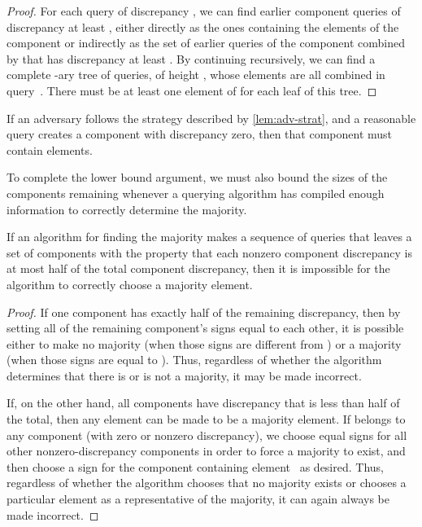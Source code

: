 \documentclass[11pt]{llncs}
\begin{document}
\begin{proof}
For each query  of discrepancy , we can find  earlier component queries of discrepancy at least , either directly as the ones containing the elements of the component or indirectly as the set of  earlier queries of the component combined by  that has discrepancy at least .
By continuing recursively, we can find a complete -ary tree of queries, of height , whose elements are all combined in query~. There must be at least one element of  for each leaf of this tree.
\end{proof}

\begin{corollary}
\label{cor:zero-components}
If an adversary follows the strategy described by \autoref{lem:adv-strat}, and a reasonable query creates a component with discrepancy zero, then that component must contain  elements.
\end{corollary}

To complete the lower bound argument, we must also bound the sizes of the components remaining whenever a querying algorithm has compiled enough information to correctly determine the majority.

\begin{lemma}
If an algorithm for finding the majority makes a sequence of queries that leaves a set of components with the property that each nonzero component discrepancy is at most half of the total component discrepancy, then it is impossible for the algorithm to correctly choose a majority element.
\end{lemma}

\begin{proof}
If one component  has exactly half of the remaining discrepancy, then by setting all of the remaining component's signs  equal to each other, it is possible either to make no majority (when those signs are different from ) or a majority (when those signs are equal to ). Thus, regardless of whether the algorithm determines that there is or is not a majority, it may be made incorrect.

If, on the other hand, all components have discrepancy that is less than half of the total, then any element  can be made to be a majority element. If  belongs to any component (with zero or nonzero discrepancy), we choose equal signs for all other nonzero-discrepancy components in order to force a majority to exist, and then choose a sign for the component containing element~ as desired. Thus, regardless of whether the algorithm chooses that no majority exists or chooses a particular element as a representative of the majority, it can again always be made incorrect.
\end{proof}
\end{document}
